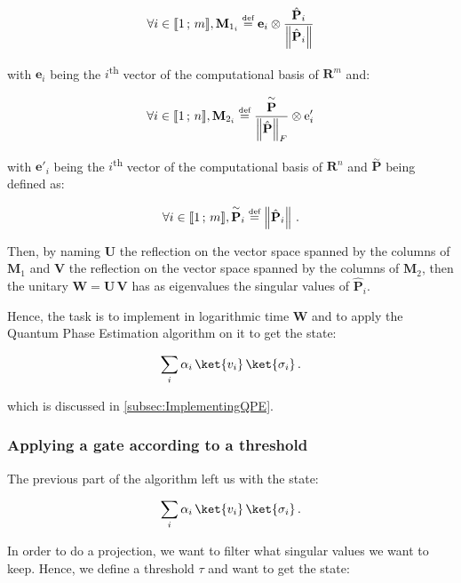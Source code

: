 \documentclass[11pt, a4paper]{article}
\begin{document}
                \[\forall i\in\llbracket1\,;\,m\rrbracket,\mathbf{M}_{1_i}\overset{\text{\tiny{def}}}{=}\mathbf{e}_i\otimes\frac{\hat{\mathbf{P}}_i}{\left\|\hat{\mathbf{P}}_i\right\|}\]
                
                with \(\mathbf{e}_i\) being the \(i\)\textsuperscript{th} vector of the computational basis of \(\mathbf{R}^{m}\) and:
                
                \[\forall i\in\llbracket1\,;\,n\rrbracket,\mathbf{M}_{2_i}\overset{\text{\tiny{def}}}{=}\frac{\overset{\sim}{\mathbf{P}}}{\left\|\hat{\mathbf{P}}\right\|_F}\otimes\mathrm{e}'_i\]
                
                with \(\mathbf{e}'_i\) being the \(i\)\textsuperscript{th} vector of the computational basis of \(\mathbf{R}^{n}\) and \(\overset{\sim}{\mathbf{P}}\) being defined as:
                
                \[\forall i\in\llbracket1\,;\,m\rrbracket,\overset{\sim}{\mathbf{P}}_i\overset{\text{\tiny{def}}}{=}\left\|\hat{\mathbf{P}}_i\right\|\,.\]
                
                Then, by naming \(\mathbf{U}\) the reflection on the vector space spanned by the columns of \(\mathbf{M}_1\) and \(\mathbf{V}\) the reflection on the vector space spanned by the columns of \(\mathbf{M}_2\), then the unitary \(\mathbf{W} = \mathbf{U}\,\mathbf{V}\) has as eigenvalues the singular values of \(\hat{\mathbf{P}}_i\).
                
                Hence, the task is to implement in logarithmic time \(\mathbf{W}\) and to apply the Quantum Phase Estimation algorithm on it to get the state:
                
                \[\sum_{i}\alpha_i\,\ket{v_i}\,\ket{\sigma_i}\,.\]
                
                which is discussed in \autoref{subsec:ImplementingQPE}.
            \subsubsection{Applying a gate according to a threshold}
                The previous part of the algorithm left us with the state:
                
                \[\sum_{i}\alpha_i\,\ket{v_i}\,\ket{\sigma_i}\,.\]
                
                In order to do a projection, we want to filter what singular values we want to keep. Hence, we define a threshold \(\tau\) and want to get the state:
                
\end{document}
